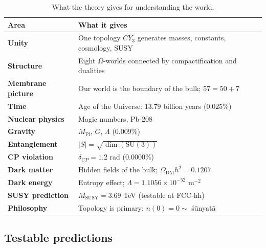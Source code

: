 \documentclass[11pt,a4paper]{article}
\newcommand{\SU}{\mathrm{SU}}
\newcommand{\CY}{CY_3}
\newcommand{\Mpl}{M_{\text{Pl}}}
\newcommand{\MSUSY}{M_{\text{SUSY}}}
\theoremstyle{definition}
\begin{document}
\begin{table}[htbp]
\centering
\caption{What the theory gives for understanding the world.}
\label{tab:conclusions-what-gives}
\begin{tabular}{p{4cm}p{8cm}}
\toprule
Area & What it gives \\
\midrule
\textbf{Unity} & 
    One topology $\CY$ generates masses, constants, 
    cosmology, SUSY \\[0.3em]
\textbf{Structure} & 
    Eight $\Omega$-worlds connected by compactification and 
    dualities \\[0.3em]
\textbf{Membrane picture} & 
    Our world is the boundary of the bulk; $57 = 50 + 7$ \\[0.3em]
\textbf{Time} & 
    Age of the Universe: $13.79$ billion years ($0.025\%$) \\[0.3em]
\textbf{Nuclear physics} & 
    Magic numbers, Pb-208 \\[0.3em]
\textbf{Gravity} & 
    $\Mpl$, $G$, $\Lambda$ ($0.009\%$) \\[0.3em]
\textbf{Entanglement} & 
    $|S| = \sqrt{\dim(\SU(3))}$ \\[0.3em]
\textbf{CP violation} & 
    $\delta_{CP} = 1.2$ rad ($0.0000\%$) \\[0.3em]
\textbf{Dark matter} & 
    Hidden fields of the bulk; $\Omega_{\text{DM}} h^2 = 0.1207$ \\[0.3em]
\textbf{Dark energy} & 
    Entropy effect; $\Lambda = 1.1056 \times 10^{-52}$ m$^{-2}$ \\[0.3em]
\textbf{SUSY prediction} & 
    $\MSUSY = 3.69$ TeV (testable at FCC-hh) \\[0.3em]
\textbf{Philosophy} & 
    Topology is primary; $n(0) = 0 \sim$ śūnyatā \\
\bottomrule
\end{tabular}
\end{table}

\subsection{Testable predictions}
\label{subsec:conclusions-predictions}
\end{document}
